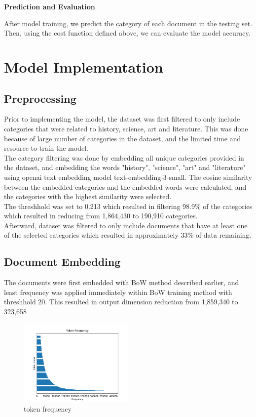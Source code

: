 \documentclass[12pt]{article}
\begin{document}
\textbf{Prediction and Evaluation}

After model training, we predict the category of each document in the testing set. Then, using the cost function defined above, we can evaluate the model accuracy.

\newpage
\section{Model Implementation}
\subsection{Preprocessing}
Prior to implementing the model, the dataset was first filtered to only include categories that were related to history, science, art and literature. This was done because of large number of categories in the dataset, and the limited time and resource to train the model.\\
The category filtering was done by embedding all unique categories provided in the dataset, and embedding the words "history", "science", "art" and "literature" using openai text embedding model text-embedding-3-small. The cosine similarity between the embedded categories and the embedded words were calculated, and the categories with the highest similarity were selected.\\
The threshhold was set to 0.213 which resulted in filtering 98.9\% of the categories which resulted in reducing from 1,864,430 to 190,910 categories.\\
Afterward, dataset was filtered to only include documents that have at least one of the selected categories which resulted in approximately 33\% of data remaining.
\subsection{Document Embedding}
The documents were first embedded with BoW method described earlier, and least frequency was applied immediately within BoW training method with threshhold 20. This resulted in output dimension reduction from 1,859,340 to 323,658\\


\begin{figure}
    \centering
    \includegraphics[width=0.5\textwidth]{bow_token_frequency.png}
    \caption{token frequency}
\end{figure}
\end{document}
